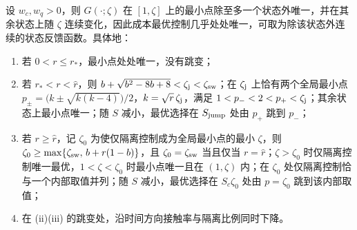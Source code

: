 \begin{proposition}
\label{prop:sup:jump}
设 $w_c,w_q>0$，则 $G(\cdot;\zeta)$ 在 $[1,\zeta]$ 上的最小点除至多一个状态外唯一，并在其余状态上随 $\zeta$ 连续变化，因此成本最优控制几乎处处唯一，可取为除该状态外连续的状态反馈函数。具体地：
\begin{enumerate}
\renewcommand{\labelenumi}{(\roman{enumi})}
\item 若 $0<r\le r_*$，最小点处处唯一，没有跳变；
\item 若 $r_*<r<\hat r$，则 $b+\sqrt{b^2-8b+8}<\zeta_{\rm j}<\zeta_{\rm sw}$；在 $\zeta_{\rm j}$ 上恰有两个全局最小点 $p_\pm=\bigl(k\pm\sqrt{k(k-4)}\bigr)/2$，$k=\sqrt r\,\zeta_{\rm j}$，满足 $1<p_-<2<p_+<\zeta_{\rm j}$；其余状态上最小点唯一；随 $S$ 减小，最优选择在 $S_{\rm jump}$ 处由 $p_+$ 跳到 $p_-$；
\item 若 $r\ge\hat r$，记 $\zeta_0$ 为使仅隔离控制成为全局最小点的最小 $\zeta$，则 $\zeta_0\ge\max\{\zeta_{\rm sw},\,b+r(1-b)\}$，且 $\zeta_0=\zeta_{\rm sw}$ 当且仅当 $r=\hat r$；$\zeta>\zeta_0$ 时仅隔离控制唯一最优，$1<\zeta<\zeta_0$ 时最小点唯一且在 $(1,\zeta)$ 内；在 $\zeta_0$ 处仅隔离控制恰与一个内部取值并列；随 $S$ 减小，最优选择在 $S_c\zeta_0$ 处由 $p=\zeta_0$ 跳到该内部取值；
\item 在 (ii)(iii) 的跳变处，沿时间方向接触率与隔离比例同时下降。
\end{enumerate}
\end{proposition}
